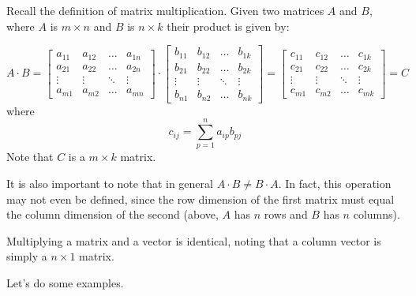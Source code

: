 \documentclass[12pt]{article}
\begin{document}
Recall the definition of matrix multiplication. Given two matrices $A$ and $B$, where $A$ is $m \times n$ and $B$ is $n \times k$ their product is given by:


\begin{equation*}
A \cdot B =
\begin{bmatrix}
    a_{11} & a_{12} & \dots  & a_{1n} \\
    a_{21} & a_{22} & \dots  & a_{2n} \\
    \vdots & \vdots & \ddots & \vdots \\
    a_{m1} & a_{m2} & \dots  & a_{mn}
\end{bmatrix} \cdot
\begin{bmatrix}
    b_{11} & b_{12} & \dots  & b_{1k} \\
    b_{21} & b_{22} & \dots  & b_{2k} \\
    \vdots & \vdots & \ddots & \vdots \\
    b_{n1} & b_{n2} & \dots  & b_{nk}
\end{bmatrix} =
\begin{bmatrix}
    c_{11} & c_{12} & \dots  & c_{1k} \\
    c_{21} & c_{22} & \dots  & c_{2k} \\
    \vdots & \vdots & \ddots & \vdots \\
    c_{m1} & c_{m2} & \dots  & c_{mk}
\end{bmatrix} = C
\end{equation*}
where
\begin{equation*}
c_{ij} = \sum_{p=1}^n a_{ip}b_{pj}
\end{equation*}
Note that $C$ is a $m \times k$ matrix. 

It is also important to note that in general $A \cdot B \neq B \cdot A$. In fact, this operation may not even be defined, since the row dimension of the first matrix must equal the column dimension of the second (above, $A$ has $n$ rows and $B$ has $n$ columns).

Multiplying a matrix and a vector is identical, noting that a column vector is simply a $n \times 1$ matrix. 

Let's do some examples. 
\end{document}
